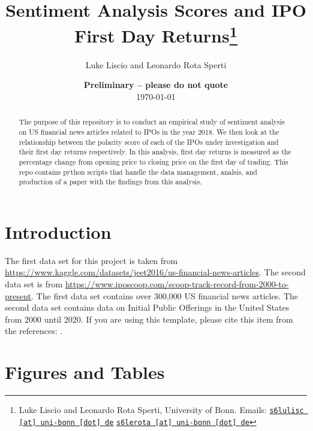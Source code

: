 \documentclass[11pt, a4paper, leqno]{article}
\begin{document}
\title{Sentiment Analysis Scores and IPO First Day Returns\thanks{Luke Liscio and Leonardo Rota Sperti, University of Bonn. Emails: \href{mailto:s6lulisc@uni-bonn.de}{\nolinkurl{s6lulisc [at] uni-bonn [dot] de}} \href{mailto:s6lerota@uni-bonn.de}{\nolinkurl{s6lerota [at] uni-bonn [dot] de}}}}

\author{Luke Liscio and Leonardo Rota Sperti}

\date{
    {\bf Preliminary -- please do not quote}
    \\[1ex]
    \today
}

\maketitle


\begin{abstract}
    The purpose of this repository is to conduct an empirical study of sentiment analysis on
US financial news articles related to IPOs in the year 2018. We then look at the
relationship between the polarity score of each of the IPOs under investigation and
their first day returns respectively. In this analysis, first day returns is measured as
the percentage change from opening price to closing price on the first day of trading.
This repo contains python scripts that handle the data management, analsis, and
production of a paper with the findings from this analysis.
\end{abstract}

\clearpage


\section{Introduction} %
\label{sec:introduction}

The first data set for this project is taken from
\url{https://www.kaggle.com/datasets/jeet2016/us-financial-news-articles}.
The second data set is from
\url{https://www.iposcoop.com/scoop-track-record-from-2000-to-present}.
The first data set contains over 300,000 US financial news articles.
The second data set contains data on Initial Public Offerings in the United States from 2000 until 2020.
If you are using this template, please cite this item from the references:
\citet{GaudeckerEconProjectTemplates}.

\section{Figures and Tables}
\label{sec:Figures and Tables}
\end{document}
